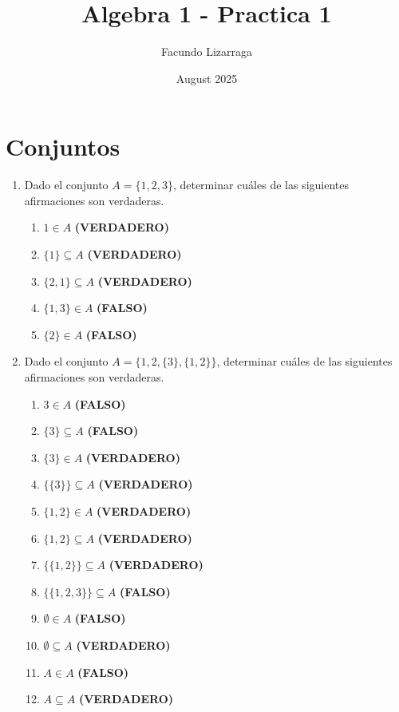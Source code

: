 \documentclass{article}
\title{Algebra 1 - Practica 1}
\author{Facundo Lizarraga}
\date{August 2025}
\begin{document}
\maketitle

\section{Conjuntos}


\begin{enumerate}
    \item Dado el conjunto $A = \{1, 2, 3\}$, determinar cuáles de las siguientes afirmaciones son verdaderas.
    \begin{enumerate}[label=\alph*)]
        \item $1 \in A$ \textbf{(VERDADERO)}
        \item $\{1\} \subseteq A$ \textbf{(VERDADERO)}
        \item $\{2,1\} \subseteq A$ \textbf{(VERDADERO)}
        \item $\{1,3\} \in A$ \textbf{(FALSO)}
        \item $\{2\} \in A$ \textbf{(FALSO)}
    \end{enumerate}

    \item Dado el conjunto $A = \{1, 2, \{3\}, \{1, 2\}\}$, determinar cuáles de las siguientes afirmaciones son verdaderas.
    \begin{enumerate}[label=\alph*)]
        \item $3 \in A$ \textbf{(FALSO)}
        \item $\{3\} \subseteq A$ \textbf{(FALSO)}
        \item $\{3\} \in A$ \textbf{(VERDADERO)}
        \item $\{\{3\}\} \subseteq A$ \textbf{(VERDADERO)}
        \item $\{1,2\} \in A$ \textbf{(VERDADERO)}
        \item $\{1,2\} \subseteq A$ \textbf{(VERDADERO)}
        \item $\{\{1,2\}\} \subseteq A$ \textbf{(VERDADERO)}
        \item $\{\{1,2,3\}\} \subseteq A$ \textbf{(FALSO)}
        \item $\emptyset \in A$ \textbf{(FALSO)}
        \item $\emptyset \subseteq A$ \textbf{(VERDADERO)}
        \item $A \in A$ \textbf{(FALSO)}
        \item $A \subseteq A$ \textbf{(VERDADERO)}
    \end{enumerate}


\end{enumerate}
\end{document}
